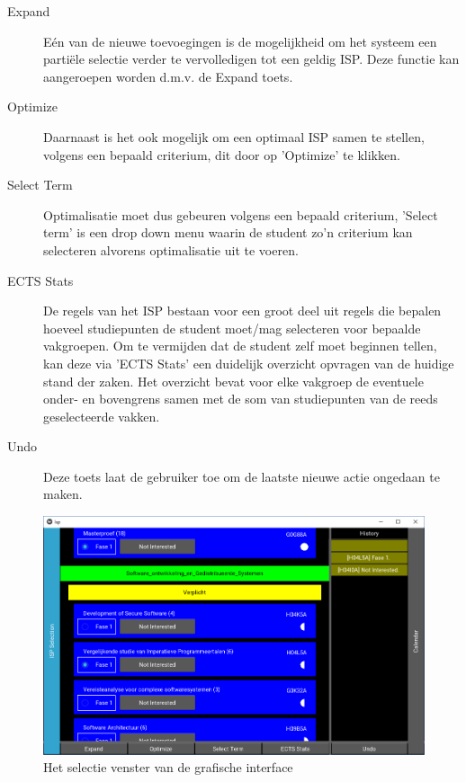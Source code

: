 \begin{description}
\item [Expand] E\'{e}n van de nieuwe toevoegingen is de mogelijkheid om het systeem een parti\"{e}le selectie verder te vervolledigen tot een geldig ISP. Deze functie kan aangeroepen worden d.m.v. de Expand toets.
\item[Optimize] Daarnaast is het ook mogelijk om een optimaal ISP samen te stellen, volgens een bepaald criterium, dit door op 'Optimize' te klikken.
\item[Select Term] Optimalisatie moet dus gebeuren volgens een bepaald criterium, 'Select term' is een drop down menu waarin de student zo'n criterium kan selecteren alvorens optimalisatie uit te voeren.
\item[ECTS Stats] De regels van het ISP bestaan voor een groot deel uit regels die bepalen hoeveel studiepunten de student moet/mag selecteren voor bepaalde vakgroepen. Om te vermijden dat de student zelf moet beginnen tellen, kan deze via 'ECTS Stats' een duidelijk overzicht opvragen van de huidige stand der zaken. Het overzicht bevat voor elke vakgroep de eventuele onder- en bovengrens samen met de som van studiepunten van de reeds geselecteerde vakken.
\item[Undo] Deze toets laat de gebruiker toe om de laatste nieuwe actie ongedaan te maken. 
\end{description}

\begin{figure}
\caption{Het selectie venster van de grafische interface\label{fig:sc1}}
\centering
\includegraphics[scale=.5]{sc1.png}
\end{figure}

